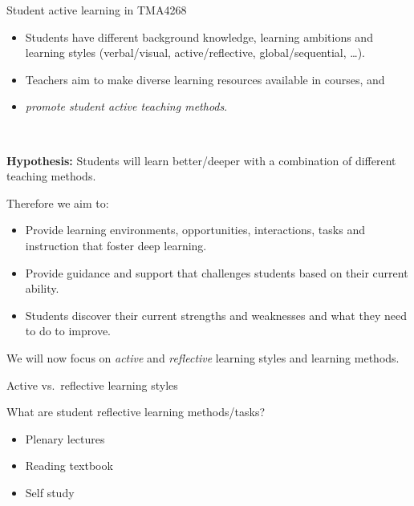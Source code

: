 \documentclass[ignorenonframetext,]{beamer}
\providecommand{\tightlist}{%
  \setlength{\itemsep}{0pt}\setlength{\parskip}{0pt}}
\begin{document}
\begin{frame}

\begin{block}{Student active learning in TMA4268}

\begin{itemize}
\item
  Students have different background knowledge, learning ambitions and
  learning styles (verbal/visual, active/reflective, global/sequential,
  \ldots{}). ~
\item
  Teachers aim to make diverse learning resources available in courses,
  and ~
\item
  \emph{promote student active teaching methods}.
\end{itemize}

~

\textbf{Hypothesis:} Students will learn better/deeper with a
combination of different teaching methods.

\end{block}

\end{frame}

\begin{frame}

Therefore we aim to:

\begin{itemize}
\tightlist
\item
  Provide learning environments, opportunities, interactions, tasks and
  instruction that foster deep learning.
\item
  Provide guidance and support that challenges students based on their
  current ability.
\item
  Students discover their current strengths and weaknesses and what they
  need to do to improve.
\end{itemize}

We will now focus on \emph{active} and \emph{reflective} learning styles
and learning methods.

\end{frame}

\begin{frame}

\begin{block}{Active vs.~reflective learning styles}

\begin{block}{What are student reflective learning methods/tasks?}

\begin{itemize}
\tightlist
\item
  Plenary lectures
\item
  Reading textbook
\item
  Self study
\end{itemize}

\end{block}

\end{block}

\end{frame}
\end{document}
